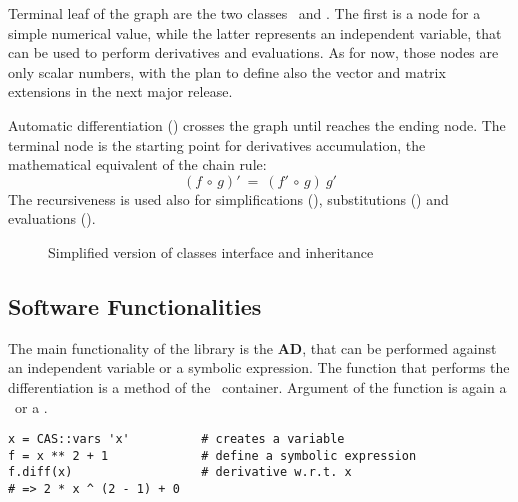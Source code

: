 Terminal leaf of the graph are the two classes \CASConstant~and \CASVariable. The first is a node for a simple numerical value, while the latter represents an independent variable, that can be used to perform derivatives and evaluations. As for now, those nodes are only scalar numbers, with the plan to define also the vector and matrix extensions in the next major release.

Automatic differentiation (\CASOpdiff) crosses the graph until reaches the ending node. The terminal node is the starting point for derivatives accumulation, the mathematical equivalent of the chain rule:
\begin{equation}
\left( f  \, \circ \, g \right)' \: = \:
\left( f' \, \circ \, g \right) \: g'
\end{equation}
The recursiveness is used also for simplifications (\CASOpsimplify), substitutions (\CASOpsubs) and evaluations (\CASOpcall).

\begin{figure}[ht!]
\label{fig:uml-container}
\centering

\caption{Simplified version of classes interface and inheritance}
\end{figure}

\subsection{Software Functionalities}
\label{sec:functionalities}


The main functionality of the library is the \textbf{AD}, that can be performed against an independent variable or a symbolic expression. The function that performs the differentiation is a method of the \CASOp~container. Argument of the function is again a \CASOp~or a \CASVariable.
\begin{lstlisting}
x = CAS::vars 'x'          # creates a variable
f = x ** 2 + 1             # define a symbolic expression
f.diff(x)                  # derivative w.r.t. x
# => 2 * x ^ (2 - 1) + 0
\end{lstlisting}

